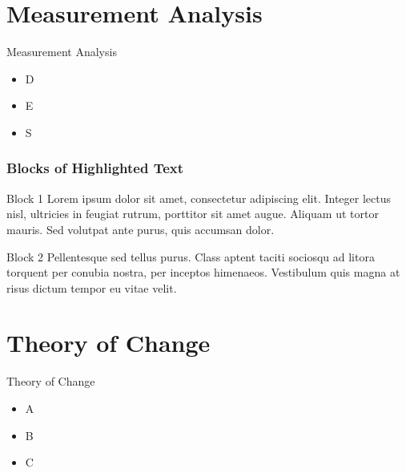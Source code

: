 \documentclass{beamer}
\begin{document}
\section{Measurement Analysis}
\begin{frame}{Measurement Analysis}
    \begin{itemize}
        \item D
        \item E
        \item S
    \end{itemize}
\end{frame}
\begin{frame}
\frametitle{Blocks of Highlighted Text}
\begin{block}{Block 1}
Lorem ipsum dolor sit amet, consectetur adipiscing elit. Integer lectus nisl, ultricies in feugiat rutrum, porttitor sit amet augue. Aliquam ut tortor mauris. Sed volutpat ante purus, quis accumsan dolor.
\end{block}

\begin{block}{Block 2}
Pellentesque sed tellus purus. Class aptent taciti sociosqu ad litora torquent per conubia nostra, per inceptos himenaeos. Vestibulum quis magna at risus dictum tempor eu vitae velit.
\end{block}
\end{frame}
\section{Theory of Change}
\begin{frame}{Theory of Change}
    \begin{itemize}
        \item A
        \item B
        \item C
    \end{itemize}
\end{frame}
\end{document}
